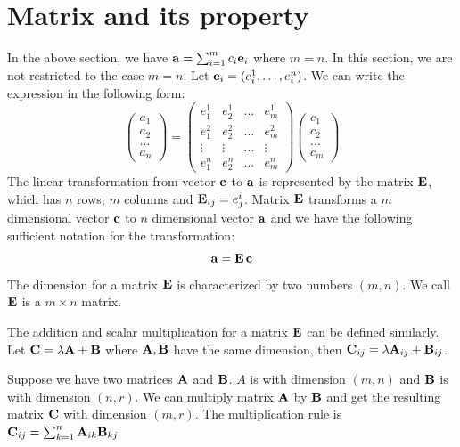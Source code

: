\section{Matrix and its property}
In the above section, we have $\mathbf{a} = \sum_{i=1}^m c_i \mathbf{e}_i$ where $m=n$. In this section, we are not restricted to the case $m=n$. Let $\mathbf{e}_i = (e_i^1, \dots, e_i^n)$. We can write the expression in the following form:
\begin{equation}
	\begin{pmatrix} a_1 \\ a_2 \\ \dots \\ a_n \end{pmatrix}
	 = \begin{pmatrix} e^1_1 & e^1_2 & \dots & e^1_m \\ e^2_1 & e^2_2 & \dots & e^2_m \\ 
	 	\vdots & \vdots & \dots & \vdots \\
	 	 e^n_1 & e^n_2 & \dots & e^n_m \end{pmatrix} \begin{pmatrix} c_1 \\ c_2 \\ \dots \\ c_m \end{pmatrix}
\end{equation}
The linear transformation from vector $\mathbf{c}$ to $\mathbf{a}$ is represented by the matrix $\mathbf{E}$, which has $n$ rows, $m$ columns and $\mathbf{E}_{ij} = e^i_j$.
Matrix $\mathbf{E}$ transforms a $m$ dimensional vector $\mathbf{c}$ to $n$ dimensional vector $\mathbf{a}$ and 
we have the following sufficient notation for the transformation:
\begin{equation}
\mathbf{a} = \mathbf{E}\, \mathbf{c}
\end{equation}
The dimension for a matrix $\mathbf{E}$ is characterized by two numbers $(m,n)$. We call $\mathbf{E}$ is a $m\times n$ matrix.

The addition and scalar multiplication for a matrix $\mathbf{E}$ can be defined similarly. Let $\mathbf{C} = \lambda \mathbf{A} + \mathbf{B}$ where $\mathbf{A}, \mathbf{B}$ have the same dimension, then $\mathbf{C}_{ij} = \lambda \mathbf{A}_{ij} + \mathbf{B}_{ij}$.

Suppose we have two matrices $\mathbf{A}$ and $\mathbf{B}$.  $A$ is with dimension $(m,n)$ and $\mathbf{B}$ is with dimension $(n,r)$. We can multiply matrix $\mathbf{A}$ by $\mathbf{B}$ and get the resulting matrix $\mathbf{C}$ with dimension $(m, r)$. The multiplication rule is $\mathbf{C}_{ij} = \sum_{k=1}^n \mathbf{A}_{ik}\mathbf{B}_{kj}$
